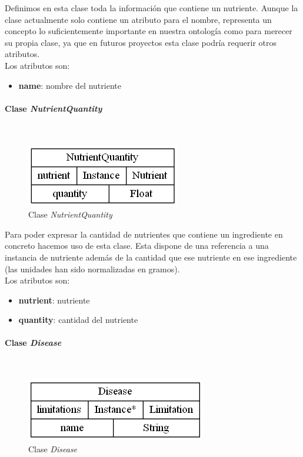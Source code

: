 \documentclass[11]{article}
\begin{document}
Definimos en esta clase toda la información que contiene un nutriente.
Aunque la clase actualmente solo contiene un atributo para el nombre, representa un concepto lo suficientemente importante en nuestra ontología como para merecer su propia clase, ya que en futuros proyectos esta clase podría requerir otros atributos.
\\

Los atributos son:
\begin{itemize} 
\item \textbf{name}: nombre del nutriente
\end{itemize}

\vspace{0.5cm}

\paragraph{Clase \emph{NutrientQuantity}}\mbox{}\\
\begin{figure}[H]
\centering
\includegraphics[scale=0.5]{images/class_NutrientQuantity.png}
\caption{Clase \emph{NutrientQuantity}}
\label{fig_class_NutrientQuantity}
\end{figure}

Para poder expresar la cantidad de nutrientes que contiene un ingrediente en concreto hacemos uso de esta clase. Esta dispone de una referencia a una instancia de nutriente además de la cantidad que ese nutriente en ese ingrediente (las unidades han sido normalizadas en gramos). 
\\

Los atributos son: 
\begin{itemize}
\item \textbf{nutrient}: nutriente
\item \textbf{quantity}: cantidad del nutriente
\end{itemize}


\vspace{0.5cm}

\paragraph{Clase \emph{Disease}}\mbox{}\\
\begin{figure}[H]
\centering
\includegraphics[scale=0.5]{images/class_Disease.png}
\caption{Clase \emph{Disease}}
\label{fig_class_Disease}
\end{figure}
\end{document}
